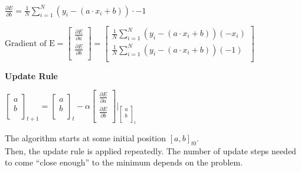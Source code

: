 \begin{center}
    $\frac{\partial E}{\partial b} = \frac{1}{N}\sum_{i=1}^N (y_i - (a \cdot x_i + b)) \cdot -1$
\end{center}

\begin{center}
    $
     \textrm{Gradient of E} = \begin{bmatrix}
                                  \frac{\partial E}{\partial a} \\
                                  \frac{\partial E}{\partial b} \\
     \end{bmatrix}
     =\begin{bmatrix}
          \frac{1}{N}\sum_{i=1}^N (y_i - (a \cdot x_i + b))(-x_i) \\
          \frac{1}{N}\sum_{i=1}^N (y_i - (a \cdot x_i + b))(-1) \\
     \end{bmatrix}
    $
\end{center}

\textbf{Update Rule}

\begin{center}
    $
    \begin{bmatrix}
        a \\
        b \\
    \end{bmatrix}_{t+1}
    =    \begin{bmatrix}
             a \\
             b \\
    \end{bmatrix}_{t} - \alpha
    \begin{bmatrix}
        \frac{\partial E}{\partial a} \\
        \frac{\partial E}{\partial b} \\
    \end{bmatrix} \Big\rvert _{\begin{bmatrix}
                                   a \\
                                   b \\
    \end{bmatrix}_{t} }
    $
\end{center}

The algorithm starts at some initial position $[a, b]_{t0}$. \\
Then, the update rule is applied repeatedly.
The number of update steps needed to come ``close enough'' to the minimum depends on the problem.

